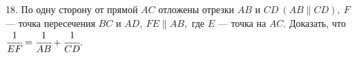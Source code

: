18. По одну сторону от прямой $AC$ отложены отрезки $AB$ и $CD\ (AB\parallel CD),\ F$ --- точка пересечения $BC$ и $AD,\ FE\parallel AB,$ где $E$ --- точка на $AC.$ Доказать, что $\cfrac{1}{EF}=\cfrac{1}{AB}+\cfrac{1}{CD}.$\\
